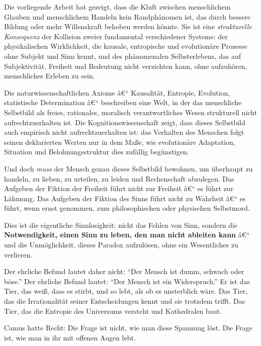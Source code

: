 ﻿\documentclass[12pt, a4paper]{article}
\begin{document}
Die vorliegende Arbeit hat gezeigt, dass die Kluft zwischen menschlichem Glauben
und menschlichem Handeln kein Randphänomen ist, das durch bessere Bildung oder
mehr Willenskraft behoben werden könnte. Sie ist eine \emph{strukturelle Konsequenz}
der Kollision zweier fundamental verschiedener Systeme: der physikalischen
Wirklichkeit, die kausale, entropische und evolutionäre Prozesse ohne Subjekt
und Sinn kennt, und des phänomenalen Selbsterlebens, das auf Subjektivität,
Freiheit und Bedeutung nicht verzichten kann, ohne aufzuhören, menschliches
Erleben zu sein.

Die naturwissenschaftlichen Axiome â€“ Kausalität, Entropie, Evolution, statistische
Determination â€“ beschreiben eine Welt, in der das menschliche Selbstbild als
freies, rationales, moralisch verantwortliches Wesen strukturell nicht
aufrechtzuerhalten ist. Die Kognitionswissenschaft zeigt, dass dieses Selbstbild
auch empirisch nicht aufrechtzuerhalten ist: das Verhalten des Menschen folgt
seinen deklarierten Werten nur in dem Maße, wie evolutionäre Adaptation,
Situation und Belohnungsstruktur dies zufällig begünstigen.

Und doch \emph{muss} der Mensch genau dieses Selbstbild bewohnen, um überhaupt
zu handeln, zu lieben, zu urteilen, zu leiden und Rechenschaft abzulegen. Das
Aufgeben der Fiktion der Freiheit führt nicht zur Freiheit â€“ es führt zur Lähmung.
Das Aufgeben der Fiktion des Sinns führt nicht zu Wahrheit â€“ es führt, wenn
ernst genommen, zum philosophischen oder physischen Selbstmord.

Dies ist die eigentliche Sinnlosigkeit: nicht das Fehlen von Sinn, sondern die
\textbf{Notwendigkeit, einen Sinn zu leben, den man nicht ableiten kann} â€“ und
die Unmöglichkeit, dieses Paradox aufzulösen, ohne ein Wesentliches zu verlieren.

Der ehrliche Befund lautet daher nicht: \enquote{Der Mensch ist dumm, schwach
oder böse.} Der ehrliche Befund lautet: \enquote{Der Mensch ist ein
Widerspruch.} Er ist das Tier, das weiß, dass es stirbt, und so lebt, als ob
es unsterblich wäre. Das Tier, das die Irrationalität seiner Entscheidungen kennt
und sie trotzdem trifft. Das Tier, das die Entropie des Universums versteht
und Kathedralen baut.

Camus hatte Recht: Die Frage ist nicht, wie man diese Spannung löst. Die
Frage ist, wie man in ihr mit offenen Augen lebt.

\end{document}
